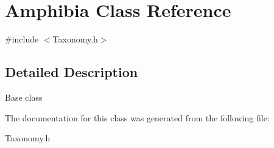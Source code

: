 \hypertarget{classAmphibia}{}\section{Amphibia Class Reference}
\label{classAmphibia}


{\ttfamily \#include $<$Taxonomy.\+h$>$}



\subsection{Detailed Description}
Base class 

The documentation for this class was generated from the following file\+:\begin{DoxyCompactItemize}
\item 
Taxonomy.\+h\end{DoxyCompactItemize}
